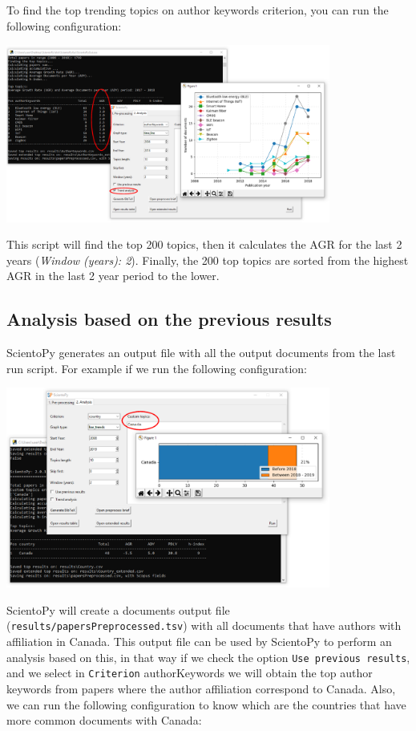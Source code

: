 \documentclass[10pt,letterpaper]{article}
\begin{document}
To find the top trending topics on author keywords criterion, you can run the following configuration: 

\begin{center}
	\includegraphics[width=0.8\textwidth]{./figures/win_analysis7.eps}
\end{center}

This script will find the top 200 topics, then it calculates the AGR for the last 2 years (\textit{Window (years): 2}). Finally, the 200 top topics are sorted from the highest AGR in the last 2 year period to the lower. 

\subsection{Analysis based on the previous results}

ScientoPy generates an output file with all the output documents from the last run script. For example if we run the following configuration:

\begin{center}
	\includegraphics[width=0.8\textwidth]{./figures/win_analysis8.eps}
\end{center}

ScientoPy will create a documents output file (\verb|results/papersPreprocessed.tsv|) with all documents that have authors with affiliation in Canada. This output file can be used by ScientoPy to perform an analysis based on this, in that way if we check the option \verb|Use previous results|, and we select in \verb|Criterion| authorKeywords we will obtain the top author keywords from papers where the author affiliation correspond to Canada. Also, we can run the following configuration to know which are the countries that have more common documents with Canada:
\end{document}
